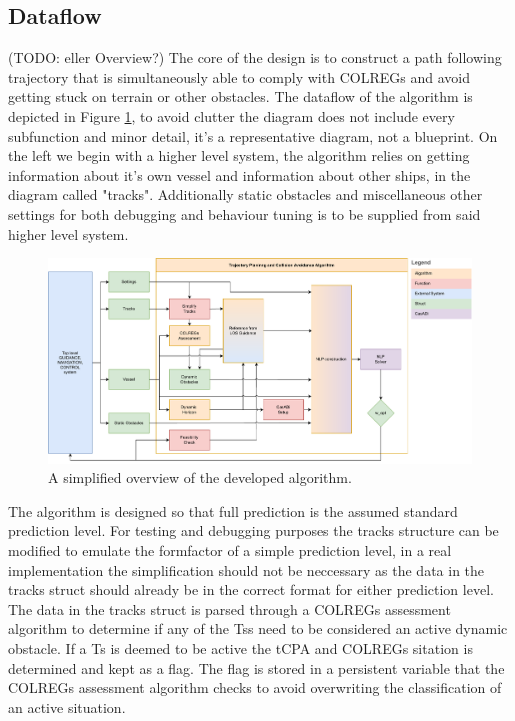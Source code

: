 \subsection{Dataflow} (TODO: eller Overview?)
The core of the design is to construct a path following trajectory that is simultaneously able to comply with \gls{COLREGs} and avoid getting stuck
on terrain or other obstacles. The dataflow of the algorithm is depicted in Figure \ref{FIG: Dataflow chart}, 
to avoid clutter the diagram does not include every subfunction and minor detail, it's a
representative diagram, not a blueprint. On the left we begin with a higher level system, the algorithm
relies on getting information about it's own vessel and information about other ships, in the diagram called "tracks". Additionally
static obstacles and miscellaneous other settings for both debugging and behaviour tuning is to be supplied from said higher level system.

\begin{figure}[ht!]
    \includegraphics[width=\textwidth]{Images/SimpleSystem.pdf}
    \caption{A simplified overview of the developed algorithm.}
    \label{FIG: Dataflow chart}
\end{figure}

The algorithm is designed so that full prediction is the assumed standard prediction level. For testing and debugging purposes the tracks
structure can be modified to emulate the formfactor of a simple prediction level, in a real implementation the simplification should not be neccessary
as the data in the tracks struct should already be in the correct format for either prediction level.
The data in the tracks struct is parsed through a \gls{COLREGs} assessment algorithm to determine if any of the \gls{Ts}s need to be considered
an active dynamic obstacle. If a \gls{Ts} is deemed to be active the \gls{tCPA} and \gls{COLREGs} sitation is determined and kept as a flag. The flag
is stored in a persistent variable that the \gls{COLREGs} assessment algorithm checks to avoid overwriting the classification of an active situation.

